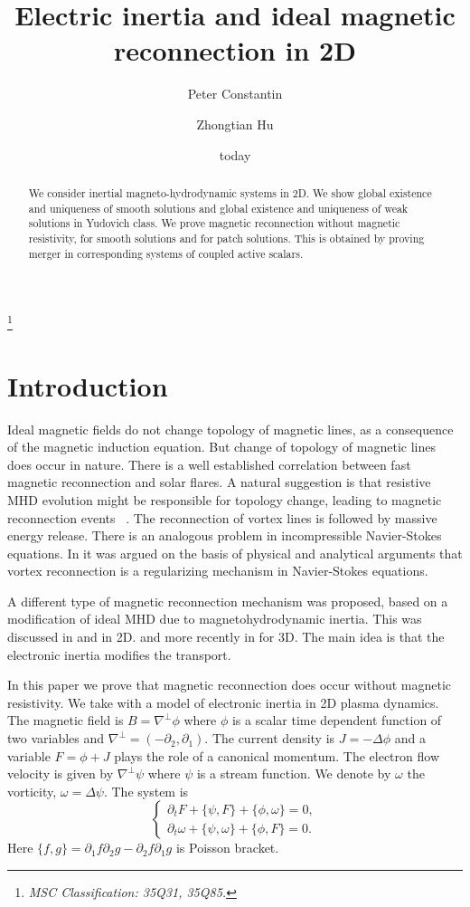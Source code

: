 \documentclass[11pt,reqno]{amsproc}
\title[]{Electric inertia and ideal magnetic reconnection in 2D}
\author{Peter Constantin}
\author{Zhongtian Hu}
\date{today}
\newcommand{\pa}{\partial}
\newcommand{\la}{\label}
\newcommand{\na}{\nabla}
\newcommand{\be}{\begin{equation}}
\newcommand{\ee}{\end{equation}}
\newcommand{\ba}{\begin{array}{l}}
\newcommand{\ea}{\end{array}}
\begin{document}
\begin{abstract}
We consider inertial magneto-hydrodynamic systems in 2D. We show global existence and uniqueness of smooth solutions and global existence and uniqueness of weak solutions in Yudovich class. We  prove magnetic reconnection without magnetic resistivity, for smooth solutions
and for patch solutions. This is obtained by proving merger  in corresponding systems of coupled active scalars.
\end{abstract}
\noindent\thanks{\em{MSC Classification:  35Q31,  35Q85.}}
\maketitle
\section{Introduction}
Ideal magnetic fields do not change topology of magnetic lines, as a consequence of the magnetic induction equation. But change of topology of magnetic lines does occur in nature. There is a well established correlation between fast magnetic reconnection and solar flares.  A natural suggestion is that resistive MHD evolution  might be responsible for topology change, leading to magnetic reconnection events ~\cite{biskamp, taylor1986}. The reconnection of vortex lines is followed by massive energy release. 
There is an analogous problem in incompressible Navier-Stokes equations. In \cite{geoman, siam} it was argued on the basis of physical and analytical arguments that vortex reconnection is a regularizing mechanism in Navier-Stokes equations.

A different type of magnetic reconnection mechanism was proposed, based on a modification of ideal MHD due to magnetohydrodynamic inertia. This was discussed in \cite{twoplasmas} and \cite{morrison} in 2D. 
and more recently in \cite{boozer} for 3D.  The main idea is that the electronic inertia modifies the transport.

In this paper we prove that magnetic reconnection does occur without magnetic resistivity.  We take with \cite{twoplasmas} a model of electronic inertia in 2D plasma dynamics.
The magnetic field is $B= \na^{\perp}\phi$ where $\phi$ is a scalar time dependent function of two variables and $\na^{\perp} = (-\pa_2,\pa_1)$. The current density is $J= -\Delta \phi$ and a variable $F = \phi + J$ plays the role of a canonical momentum. The electron flow velocity is given by $\na^{\perp}\psi$ where
$\psi$ is a stream function. We denote by
$\omega$ the vorticity, $\omega = \Delta \psi$. The system \cite{twoplasmas} is
\be
\left\{
\ba
\pa_t F + \{\psi, F\} + \{\phi, \omega\} = 0,\\
\pa_t \omega + \{\psi, \omega\} + \{\phi, F\} =0.
\ea
\right .
\la{origeq}
\ee
Here $\{f, g\} = \pa_1f\pa_2 g-\pa_2f\pa_1g$ is Poisson bracket. 
\end{document}
